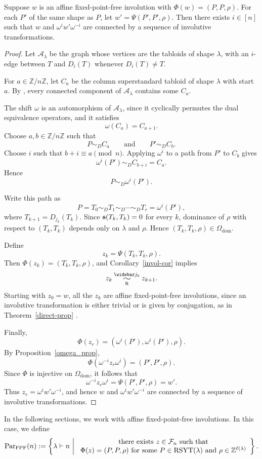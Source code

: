 \documentclass[11pt]{article}
\begin{document}
\begin{theorem}\label{omega-thm}
Suppose $w$ is an affine fixed-point-free involution with $\Phi(w)=(P,P,\rho)$. For each $P'$ of the same shape as $P$, let $w'=\Psi(P',P',\rho)$. Then there exists $i\in[n]$ such that $w$ and $\omega^i w'\omega^{-i}$ are connected by a sequence of involutive transformations.
\end{theorem}
\begin{proof}
Let $\mathcal A_\lambda$ be the graph whose vertices are the
tabloids of shape $\lambda$, with an $i$-edge between $T$ and
$D_i(T)$ whenever $D_i(T)\neq T$.

For $a\in \mathbb Z/n\mathbb Z$, let $C_a$ be the column
superstandard tabloid of shape $\lambda$ with start $a$.
By \cite[Lemma 7.4]{CLP}, every connected component of
$\mathcal A_\lambda$ contains some $C_a$.

The shift $\omega$ is an automorphism of $\mathcal A_\lambda$,
since it cyclically permutes the dual equivalence operators, and
it satisfies
\[
\omega(C_a)=C_{a+1}.
\]
Choose $a,b\in\mathbb Z/n\mathbb Z$ such that 
\[
P\sim_D C_a
\qquad\text{and}\qquad
P'\sim_D C_b.
\]
Choose $i$ such that $b+i\equiv a\pmod n$. Applying $\omega^i$
to a path from $P'$ to $C_b$ gives
\[
\omega^i(P')\sim_D C_{b+i}=C_a.
\]
Hence
\[
P\sim_D \omega^i(P').
\]

Write this path as
\[
P=T_0\sim_D T_1\sim_D\cdots\sim_D T_r=\omega^i(P'),
\]
where $T_{k+1}=D_{j_k}(T_k)$. Since $\mathbf{s}(T_k,T_k)=0$ for every $k$, dominance of $\rho$
with respect to $(T_k,T_k)$ depends only on $\lambda$ and
$\rho$. Hence $(T_k,T_k,\rho)\in\Omega_{\mathrm{dom}}$.

Define
\[
z_k=\Psi(T_k,T_k,\rho).
\]
Then $\Phi(z_k)=(T_k,T_k,\rho)$, and Corollary~\ref{invol-cor} implies
\[
z_k\simRBS{\widebar j_k}z_{k+1}.
\]
Starting with $z_0=w$, all the $z_k$ are affine
fixed-point-free involutions, since an involutive transformation
is either trivial or is given by conjugation, as in
Theorem~\ref{direct-prop} .

Finally,
\[
\Phi(z_r)=(\omega^i(P'),\omega^i(P'),\rho).
\]
By Proposition~\ref{omega_prop},
\[
\Phi(\omega^{-i}z_r\omega^i)=(P',P',\rho).
\]
Since $\Phi$ is injective on $\Omega_{\mathrm{dom}}$, it follows
that
\[
\omega^{-i}z_r\omega^i
=\Psi(P',P',\rho)=w'.
\]
Thus $z_r=\omega^i w'\omega^{-i}$, and hence $w$ and
$\omega^i w'\omega^{-i}$ are connected by a sequence of
involutive transformations.
\end{proof}

In the following sections, we work with affine fixed-point-free involutions. In this case, we define 
\[
{\operatorname{Par}_{\mathrm{FPF}}}(n)
:=
\left\{
\lambda \vdash n \ \middle|\
\begin{array}{c}
\text{there exists } z\in\mathcal{F}_n
\text{ such that}\\
\Phi(z)=(P,P,\rho)
\text{ for some }P\in\operatorname{RSYT}(\lambda)
\text{ and }\rho\in\mathbb{Z}^{\ell(\lambda)}
\end{array}
\right\}.
\]
\end{document}
